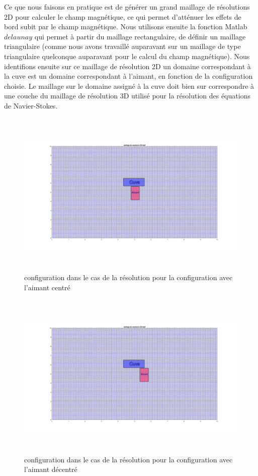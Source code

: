 \documentclass[a4paper,12pt,titlepage]{report}
\begin{document}
\begin{onehalfspace}
Ce que nous faisons en pratique est de générer un grand maillage de résolutions 2D pour calculer le champ magnétique, ce qui permet d'atténuer les effets de bord subit par le champ magnétique. 
\newline
Nous utilisons ensuite la fonction Matlab $delaunay$ qui permet à partir du maillage rectangulaire, de définir un maillage triangulaire (comme nous avons travaillé auparavant sur un maillage de type triangulaire quelconque auparavant pour le calcul du champ magnétique).
Nous identifions ensuite sur ce maillage de résolution 2D un domaine correspondant à la cuve est un domaine correspondant à l'aimant, en fonction de la configuration choisie. Le maillage sur le domaine assigné à la cuve doit bien sur correspondre à une couche du maillage de résolution 3D utilisé pour la résolution des équations de Navier-Stokes.

\begin{figure}[!h]
	\includegraphics[height = 8cm, keepaspectratio]{graphes/maillage_resolution_total_centre.jpg}
	\caption{\label{figure 3z } configuration dans le cas de la résolution pour la configuration avec l'aimant centré}
\end{figure}
\begin{figure}[!h]
	\includegraphics[height = 8cm, keepaspectratio]{graphes/maillage_resolution_total_decentre.jpg}
	\caption{\label{figure 3r } configuration dans le cas de la résolution pour la configuration avec l'aimant décentré}
\end{figure}


\end{onehalfspace}
\end{document}
